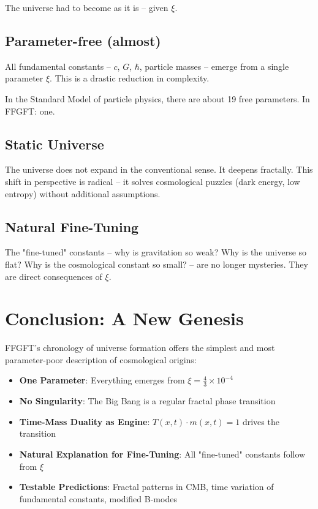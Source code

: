 	The universe had to become as it is -- given $\xi$.
	
	\subsection{Parameter-free (almost)}
	
	All fundamental constants -- $c$, $G$, $\hbar$, particle masses -- emerge from a single parameter $\xi$. This is a drastic reduction in complexity.
	
	In the Standard Model of particle physics, there are about 19 free parameters. In FFGFT: one.
	
	\subsection{Static Universe}
	
	The universe does not expand in the conventional sense. It deepens fractally. This shift in perspective is radical -- it solves cosmological puzzles (dark energy, low entropy) without additional assumptions.
	
	\subsection{Natural Fine-Tuning}
	
	The "fine-tuned" constants -- why is gravitation so weak? Why is the universe so flat? Why is the cosmological constant so small? -- are no longer mysteries. They are direct consequences of $\xi$.
	
	\section{Conclusion: A New Genesis}
	
	FFGFT's chronology of universe formation offers the simplest and most parameter-poor description of cosmological origins:
	
	\begin{itemize}[leftmargin=*]
		\item \textbf{One Parameter}: Everything emerges from $\xi = \frac{4}{3} \times 10^{-4}$
		\item \textbf{No Singularity}: The Big Bang is a regular fractal phase transition
		\item \textbf{Time-Mass Duality as Engine}: $T(x,t) \cdot m(x,t) = 1$ drives the transition
		\item \textbf{Natural Explanation for Fine-Tuning}: All "fine-tuned" constants follow from $\xi$
		\item \textbf{Testable Predictions}: Fractal patterns in CMB, time variation of fundamental constants, modified B-modes
	\end{itemize}
	
